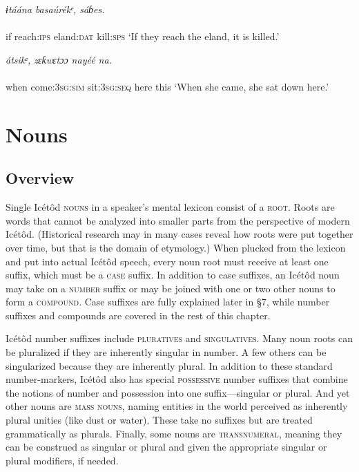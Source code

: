 \ea\label{ex:}
\textit{   ɨtáána   basaúrékᵉ,   sáɓes.} \\
    \\
if   reach:\textsc{ips}   eland:\textsc{dat}   kill:\textsc{sps}
\glt ‘If they reach the eland, it is killed.’ 
\z




\ea\label{ex:}
\textit{   átsikᵉ,       zɛƙwɛtɔɔ   nayéé   na.} \\
    \\
when   come:\textsc{3sg:sim}   sit:\textsc{3sg:seq}   here   this
\glt ‘When she came, she sat down here.’ 
\z




\section{Nouns}



\subsection{Overview}


Single Icétôd \textsc{nouns} in a speaker’s mental lexicon consist of a \textsc{root.} Roots are words that cannot be analyzed into smaller parts from the perspective of modern Icétôd. (Historical research may in many cases reveal how roots were put together over time, but that is the domain of etymology.) When plucked from the lexicon and put into actual Icétôd speech, every noun root must receive at least one suffix, which must be a \textsc{case} suffix. In addition to case suffixes, an Icétôd noun may take on a \textsc{number} suffix or may be joined with one or two other nouns to form a \textsc{compound}. Case suffixes are fully explained later in §7, while number suffixes and compounds are covered in the rest of this chapter.

Icétôd number suffixes include \textsc{pluratives} and \textsc{singulatives}. Many noun roots can be pluralized if they are inherently singular in number. A few others can be singularized because they are inherently plural. In addition to these standard number-markers, Icétôd also has special \textsc{possessive} number suffixes that combine the notions of number and possession into one suffix—singular or plural. And yet other nouns are \textsc{mass} \textsc{nouns}, naming entities in the world perceived as inherently plural unities (like dust or water). These take no suffixes but are treated grammatically as plurals. Finally, some nouns are \textsc{transnumeral}, meaning they can be construed as singular or plural and given the appropriate singular or plural modifiers, if needed. 

